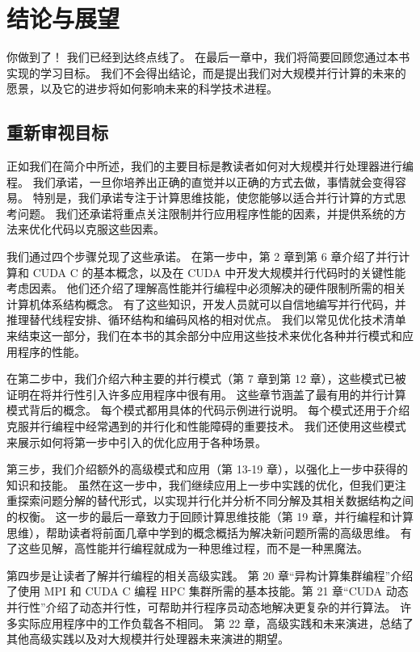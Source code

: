 \section{结论与展望}
你做到了！ 我们已经到达终点线了。 在最后一章中，我们将简要回顾您通过本书实现的学习目标。 我们不会得出结论，而是提出我们对大规模并行计算的未来的愿景，以及它的进步将如何影响未来的科学技术进程。

\subsection{重新审视目标}
正如我们在简介中所述，我们的主要目标是教读者如何对大规模并行处理器进行编程。 我们承诺，一旦你培养出正确的直觉并以正确的方式去做，事情就会变得容易。 特别是，我们承诺专注于计算思维技能，使您能够以适合并行计算的方式思考问题。 我们还承诺将重点关注限制并行应用程序性能的因素，并提供系统的方法来优化代码以克服这些因素。

我们通过四个步骤兑现了这些承诺。 在第一步中，第 2 章到第 6 章介绍了并行计算和 CUDA C 的基本概念，以及在 CUDA 中开发大规模并行代码时的关键性能考虑因素。 他们还介绍了理解高性能并行编程中必须解决的硬件限制所需的相关计算机体系结构概念。 有了这些知识，开发人员就可以自信地编写并行代码，并推理替代线程安排、循环结构和编码风格的相对优点。 我们以常见优化技术清单来结束这一部分，我们在本书的其余部分中应用这些技术来优化各种并行模式和应用程序的性能。

在第二步中，我们介绍六种主要的并行模式（第 7 章到第 12 章），这些模式已被证明在将并行性引入许多应用程序中很有用。 这些章节涵盖了最有用的并行计算模式背后的概念。 每个模式都用具体的代码示例进行说明。 每个模式还用于介绍克服并行编程中经常遇到的并行化和性能障碍的重要技术。 我们还使用这些模式来展示如何将第一步中引入的优化应用于各种场景。

第三步，我们介绍额外的高级模式和应用（第 13-19 章），以强化上一步中获得的知识和技能。 虽然在这一步中，我们继续应用上一步中实践的优化，但我们更注重探索问题分解的替代形式，以实现并行化并分析不同分解及其相关数据结构之间的权衡。 这一步的最后一章致力于回顾计算思维技能（第 19 章，并行编程和计算思维），帮助读者将前面几章中学到的概念概括为解决新问题所需的高级思维。 有了这些见解，高性能并行编程就成为一种思维过程，而不是一种黑魔法。

第四步是让读者了解并行编程的相关高级实践。 第 20 章“异构计算集群编程”介绍了使用 MPI 和 CUDA C 编程 HPC 集群所需的基本技能。第 21 章“CUDA 动态并行性”介绍了动态并行性，可帮助并行程序员动态地解决更复杂的并行算法。 许多实际应用程序中的工作负载各不相同。 第 22 章，高级实践和未来演进，总结了其他高级实践以及对大规模并行处理器未来演进的期望。

